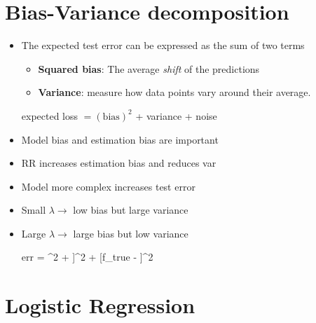 
\section{Bias-Variance decomposition}
\begin{itemize}
	\item The expected test error can be expressed as the sum of two terms
	\begin{itemize}
	 	\item \textbf{Squared bias}: The average \textit{shift} of the predictions 
	 	\item \textbf{Variance}: measure how data points vary around their average.
	 \end{itemize} 
	 \begin{center}
	 	expected loss $= (\text{bias})^2$ + variance + noise
	 \end{center}
	\item Model bias and estimation bias are important
	\item RR increases estimation bias and reduces var
	\item Model more complex increases test error
	\item Small $\lambda \rightarrow$ low bias but large variance
	\item Large $\lambda \rightarrow$ large bias but low variance
	\begin{myalign*}
	    err = \sigma^2 + \E[f_{lse} - \E[f_{lse}]]^2 + [f_{true} - \E[f_{lse}]]^2
	\end{myalign*}
\end{itemize}

\section{Logistic Regression}

